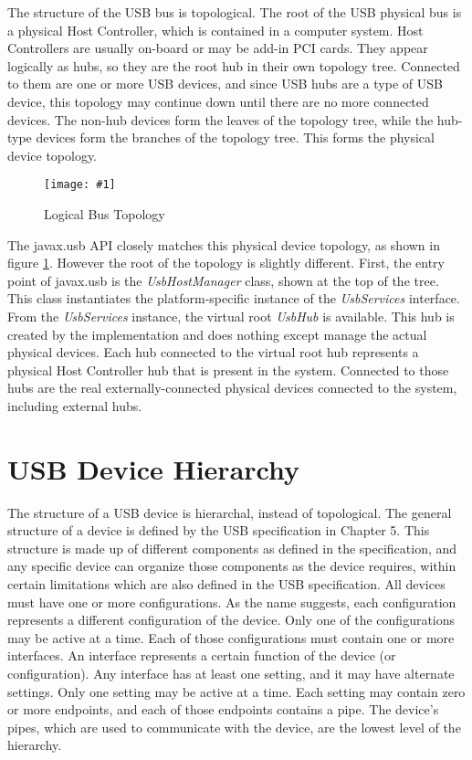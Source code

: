 \documentclass{article}
\newcommand{\myclass}[1]{\emph{#1}}
\newcommand{\myinterface}[1]{\emph{#1}}
\newcommand{\mysectionend}[0]{\vfill\pagebreak[1]}
\newcommand{\myfigure}[3]{\begin{figure}[htbp]\centering\texttt{[image: \#1]}\caption{#2}\label{#3}\end{figure}}
\begin{document}
The structure of the USB bus is topological.  The root
of the USB physical bus is a physical Host Controller, which is contained
in a computer system.  Host Controllers are usually on-board or may be
add-in PCI cards.  They appear logically as hubs, so they are the root hub
in their own topology tree.  Connected to them are one or more USB devices,
and since USB hubs are a type of USB device, this topology may continue
down until there are no more connected devices.  The non-hub devices form
the leaves of the topology tree, while the hub-type devices form the branches
of the topology tree.  This forms the physical device topology.

\myfigure{figs/logical_bus_topology}{Logical Bus Topology}{bus_topology}

The javax.usb API closely matches this physical device topology, as shown in
figure \ref{bus_topology}.  However the root of the topology is slightly different.
First, the entry point of javax.usb is the \myclass{UsbHostManager} class, shown at the
top of the tree.  This class instantiates the platform-specific instance of
the \myinterface{UsbServices} interface.  From the \myinterface{UsbServices} instance, the virtual root
\myinterface{UsbHub} is available.  This hub is created by the implementation and does
nothing except manage the actual physical devices.  Each hub connected to
the virtual root hub represents a physical Host Controller hub that is
present in the system.  Connected to those hubs are the real externally-connected
physical devices connected to the system, including external hubs.

\mysectionend


\section{USB Device Hierarchy}

The structure of a USB device is hierarchal, instead of topological.  The general
structure of a device is defined by the USB specification in Chapter 5.
This structure is made up of different components as defined in the specification,
and any specific device can organize those components as the device requires,
within certain limitations which are also defined in the USB specification.
All devices must have one or more configurations.  As the name suggests,
each configuration represents a different configuration of the device.
Only one of the configurations may be active at a time.  Each of those configurations
must contain one or more interfaces.  An interface represents a certain function
of the device (or configuration).  Any interface has at least one setting,
and it may have alternate settings.  Only one setting may be active at a time.
Each setting may contain zero or more endpoints, and each of those endpoints
contains a pipe.  The device's pipes, which are used to communicate with the
device, are the lowest level of the hierarchy.
\end{document}

